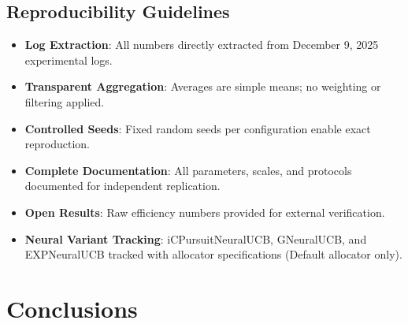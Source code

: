 \documentclass[12pt,a4paper]{article}
\begin{document}
\subsection{Reproducibility Guidelines}
\begin{itemize}
\item \textbf{Log Extraction}: All numbers directly extracted from December 9, 2025 experimental logs.
\item \textbf{Transparent Aggregation}: Averages are simple means; no weighting or filtering applied.
\item \textbf{Controlled Seeds}: Fixed random seeds per configuration enable exact reproduction.
\item \textbf{Complete Documentation}: All parameters, scales, and protocols documented for independent replication.
\item \textbf{Open Results}: Raw efficiency numbers provided for external verification.
\item \textbf{Neural Variant Tracking}: iCPursuitNeuralUCB, GNeuralUCB, and EXPNeuralUCB tracked with allocator specifications (Default allocator only).
\end{itemize}

\newpage
\section{Conclusions}
\end{document}
